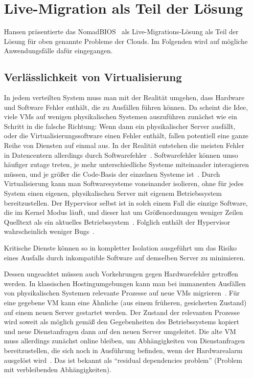 \section{Live-Migration als Teil der Lösung}
\label{sec:livemigration}
Hansen präsentierte das
NomadBIOS~\cite{nomadbioslivemigration-cloudseminar} als
Live-Migrations-Lösung als Teil der Lösung für oben genannte Probleme
der Clouds. Im Folgenden wird auf mögliche Anwendungsfälle dafür
eingegangen.

\subsection{Verlässlichkeit von Virtualisierung}
In jedem verteilten System muss man mit der Realität umgehen, dass
Hardware und Software Fehler enthält, die zu Ausfällen führen
können. Da scheint die Idee, viele \acp{VM} auf wenigen
physikalischen Systemen auszuführen zunächst wie ein Schritt in die
falsche Richtung: Wenn dann ein physikalischer Server ausfällt, oder
die Virtualisierungssoftware einen Fehler enthält, fallen potentiell
eine ganze Reihe von Diensten auf einmal aus. In der Realität
entstehen die meisten Fehler in Datencentern allerdings durch
Softwarefehler~\cite{tanenbaum1992modern}. Softwarefehler können umso
häufiger zutage treten, je mehr unterschiedliche Systeme miteinander
interagieren müssen, und je größer die Code-Basis der einzelnen
Systeme ist~\cite{zellerprograms}. Durch Virtualisierung kann man
Softwaresysteme voneinander isolieren, ohne für jedes System einen
eigenen, physikalischen Server mit eigenem Betriebssystem
bereitzustellen. Der Hypervisor selbst ist in solch einem Fall die
einzige Software, die im Kernel Modus läuft, und dieser hat um
Größenordnungen weniger Zeilen Quelltext als ein aktuelles
Betriebssystem~\cite{tanenbaum1992modern}. Folglich enthält der
Hypervisor wahrscheinlich weniger Bugs~\cite{zellerprograms}.

Kritische Dienste können so in kompletter Isolation ausgeführt um das
Risiko eines Ausfalls durch inkompatible Software auf demselben Server
zu minimieren.

Dessen ungeachtet müssen auch Vorkehrungen gegen Hardwarefehler
getroffen werden. In klassischen Hostingumgebungen kann man bei
immanenten Ausfällen von physikalischen Systemen relevante Prozesse
auf neue \acp{VM} migrieren~\cite{hansen2004self}. Für eine gegebene \ac{VM}
kann eine Ähnliche (\zB aus einem früheren, gesicherten Zustand) auf
einem neuen Server gestartet werden. Der Zustand der relevanten
Prozesse wird soweit als möglich gemäß den Gegebenheiten des
Betriebssystems kopiert und neue Dienstanfragen dann auf den neuen
Server umgeleitet. Die alte \ac{VM} muss allerdings zunächst online
bleiben, um Abhängigkeiten von Dienstanfragen bereitzustellen, die
sich noch in Ausführung befinden, wenn der Hardwarealarm ausgelöst
wird~\cite{clark2005live}. Das ist bekannt als "`residual
dependencies problem"' (Problem mit verbleibenden Abhängigkeiten).


